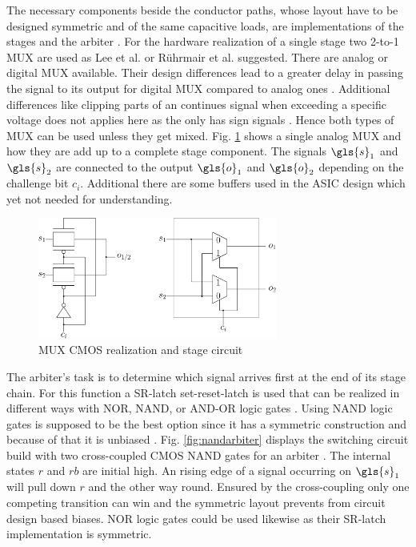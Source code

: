 The necessary components beside the conductor paths, whose layout have to be designed symmetric and of the same capacitive loads, are implementations of the stages and the arbiter \cite{Maes2012ExperimentalCMOS}.
For the hardware realization of a single stage two 2-to-1 \ac{MUX} are used as Lee et al. \cite{Lee2004AApplications} or Rührmair et al. \cite{Ruhrmair2013PUFData} suggested.
There are analog or digital \ac{MUX} available.
Their design differences lead to a greater delay in passing the signal to its output for digital \ac{MUX} compared to analog ones \cite{2016MultiplexerWikipedia}.
Additional differences like clipping parts of an continues signal when exceeding a specific voltage does not applies here as the \apuf
only has sign signals \cite{Semiconductor2002BasicComparison}.
Hence both types of \ac{MUX} can be used unless they get mixed.
Fig. \ref{fig:multiplexer} shows a single analog \ac{MUX} and how they are add up to a complete stage component.
The signals $\gls{s}_1$ and $\gls{s}_2$ are connected to the output $\gls{o}_1$ and $\gls{o}_2$ depending on the challenge bit $c_i$.
Additional there are some buffers used in the \ac{ASIC} design which yet not needed for understanding.

\begin{figure}[ht]
\centering
\includegraphics[width=0.70\textwidth]{images/stage_circuit.eps}
\caption{\ac{MUX} \ac{CMOS} realization and stage circuit}
\label{fig:multiplexer}
\end{figure}

The arbiter's task is to determine which signal arrives first at the end of its stage chain.
For this function a \ac{SR-latch} set-reset-latch is used that can be realized in different ways with NOR, NAND, or AND-OR logic gates \cite{2016Flip-flopWikipedia}.
Using NAND logic gates is supposed to be the best option since it has a symmetric construction and because of that it is unbiased \cite{Lin2010Low-powerFunctions} \cite{Maes2013PhysicallyApplications.}.
Fig. \ref{fig:nandarbiter} displays the switching circuit build with two cross-coupled \ac{CMOS} NAND gates for an arbiter \cite{2016NANDWikipedia}.
The internal states $r$ and $rb$ are initial high. 
An rising edge of a signal occurring on $\gls{s}_1$ will pull down $r$ and the other way round.
Ensured by the cross-coupling only one competing transition can win and the symmetric layout prevents from circuit design based biases.
NOR logic gates could be used likewise as their \ac{SR-latch} implementation is symmetric.

